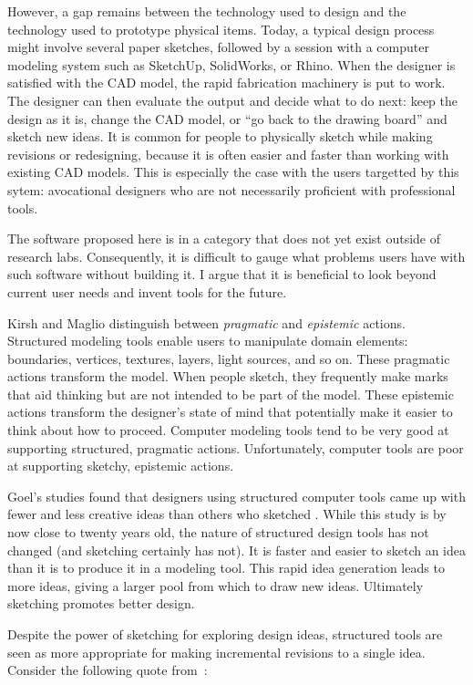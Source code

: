 \documentclass[12pt]{article}
\begin{document}
However, a gap remains between the technology used to design and the
technology used to prototype physical items. Today, a typical design
process might involve several paper sketches, followed by a session
with a computer modeling system such as SketchUp, SolidWorks, or
Rhino. When the designer is satisfied with the CAD model, the rapid
fabrication machinery is put to work. The designer can then evaluate
the output and decide what to do next: keep the design as it is,
change the CAD model, or ``go back to the drawing board'' and sketch
new ideas. It is common for people to physically sketch while making
revisions or redesigning, because it is often easier and faster than
working with existing CAD models. This is especially the case with the
users targetted by this sytem: avocational designers who are not
necessarily proficient with professional tools.

The software proposed here is in a category that does not yet exist
outside of research labs. Consequently, it is difficult to gauge what
problems users have with such software without building it. I argue
that it is beneficial to look beyond current user needs and invent
tools for the future.

Kirsh and Maglio\cite{kirsh-epistemic-pragmatic} distinguish between
\textit{pragmatic} and \textit{epistemic} actions. Structured modeling
tools enable users to manipulate domain elements: boundaries,
vertices, textures, layers, light sources, and so on. These pragmatic
actions transform the model. When people sketch, they frequently make
marks that aid thinking but are not intended to be part of the
model. These epistemic actions transform the designer's state of mind
that potentially make it easier to think about how to
proceed. Computer modeling tools tend to be very good at supporting
structured, pragmatic actions. Unfortunately, computer tools are poor
at supporting sketchy, epistemic actions.

Goel's studies found that designers using structured computer tools
came up with fewer and less creative ideas than others who sketched
\cite{goel-sketches-of-thought}. While this study is by now close to
twenty years old, the nature of structured design tools has not
changed (and sketching certainly has not). It is faster and easier to
sketch an idea than it is to produce it in a modeling tool. This rapid
idea generation leads to more ideas, giving a larger pool from which
to draw new ideas. Ultimately sketching promotes better design.

Despite the power of sketching for exploring design ideas, structured
tools are seen as more appropriate for making incremental revisions to
a single idea. Consider the following quote
from~\cite{newman-web-designers}:
\end{document}
